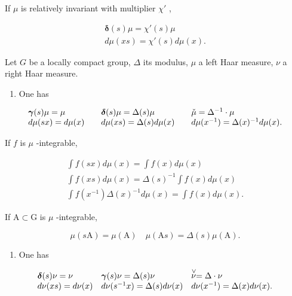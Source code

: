If \(\mu\) is relatively invariant with multiplier \(\chi'\) ,

\[
\begin{array}{l} \pmb {\delta} (s) \mu = \chi' (s) \mu \\ d \mu (x s) = \chi' (s) d \mu (x). \end{array}
\]


Let \(G\) be a locally compact group, \(\Delta\) its modulus, \(\mu\) a left Haar measure, \(\nu\) a right Haar measure.

\begin{enumerate}
\def\labelenumi{\arabic{enumi})}
\tightlist
\item
  One has
\end{enumerate}

\[
\begin{array}{l l l l} \boldsymbol {\gamma} (s) \mu = \mu & \quad \boldsymbol {\delta} (s) \mu = \Delta (s) \mu & \quad \check {\mu} = \Delta^ {- 1} \cdot \mu \\ d \mu (s x) = d \mu (x) & \quad d \mu (x s) = \Delta (s)   d \mu (x) & \quad d \mu (x ^ {- 1}) = \Delta (x) ^ {- 1}   d \mu (x). \end{array}
\]

If \(f\) is \(\mu\) -integrable,

\[
\begin{array}{c} \int f (s x) d \mu (x) = \int f (x) d \mu (x) \\ \int f (x s) d \mu (x) = \Delta (s) ^ {- 1} \int f (x) d \mu (x) \\ \int f (x ^ {- 1}) \Delta (x) ^ {- 1} d \mu (x) = \int f (x) d \mu (x). \end{array}
\]

If \(\mathrm{A}\subset \mathrm{G}\) is \(\mu\) -integrable,

\[
\mu (s \mathrm{A}) = \mu (\mathrm{A}) \quad \mu (\mathrm{A} s) = \Delta (s) \mu (\mathrm{A}).
\]

\begin{enumerate}
\def\labelenumi{\arabic{enumi})}
\setcounter{enumi}{1}
\tightlist
\item
  One has
\end{enumerate}

\[
\begin{array}{l l l l} \boldsymbol {\delta} (s) \nu = \nu & \boldsymbol {\gamma} (s) \nu = \Delta (s) \nu & \stackrel {{\vee}} {{\nu}} = \Delta \cdot \nu \\ d \nu (x s) = d \nu (x) & d \nu (s ^ {- 1} x) = \Delta (s)   d \nu (x) & d \nu (x ^ {- 1}) = \Delta (x)   d \nu (x). \end{array}
\]


